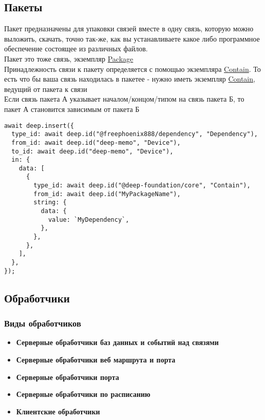 \documentclass{article}
\begin{document}
\subsection{Пакеты}
Пакет предназначены для упаковки связей вместе в одну связь, которую можно выложить, скачать, точно так-же, как вы устанавливаете какое либо программное обеспечение состоящее из различных файлов. \\
Пакет это тоже связь, экземпляр \hyperlink{Core.Package}{Package} \\
Принадлежность связи к пакету определяется с помощью экземпляра \hyperlink{Contain.Def}{Contain}. То есть что бы ваша связь находилась в пакетее - нужно иметь экземпляр \hyperlink{Core.Contain.Def}{Contain}, ведущий от пакета к связи \\
Если связь пакета А указывает началом/концом/типом на связь пакета Б, то пакет А становится зависимым от пакета Б \\

\begin{lstlisting}
await deep.insert({
  type_id: await deep.id("@freephoenix888/dependency", "Dependency"),
  from_id: await deep.id("deep-memo", "Device"),
  to_id: await deep.id("deep-memo", "Device"),
  in: {
    data: [
      {
        type_id: await deep.id("@deep-foundation/core", "Contain"),
        from_id: await deep.id("MyPackageName"),
        string: {
          data: {
            value: `MyDependency`,
          },
        },
      },
    ],
  },
});
\end{lstlisting}

\subsection{Обработчики}

\subsubsection{Виды обработчиков}
\begin{itemize}
  \item \textbf{Серверные обработчики баз данных и событий над связями}
  \item \textbf{Серверные обработчики веб маршрута и порта}
  \item \textbf{Серверные обработчики порта}
  \item \textbf{Серверные обработчики по расписанию}
  \item \textbf{Клиентские обработчики}
\end{itemize}
\end{document}
